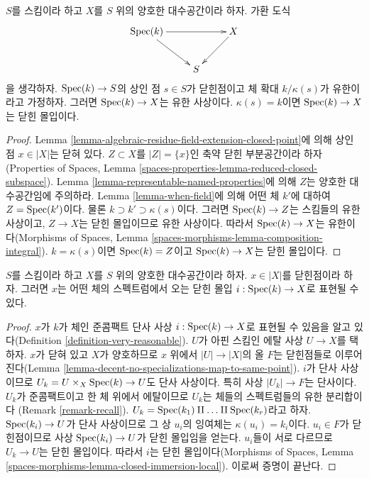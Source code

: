 \begin{lemma}
\label{lemma-finite-residue-field-extension-finite}
$S$를 스킴이라 하고 $X$를 $S$ 위의 양호한 대수공간이라 하자.
가환 도식
$$
\xymatrix{
\Spec(k) \ar[rr] \ar[rd] & & X \ar[ld] \\
& S
}
$$
을 생각하자. $\mathop{\mathrm{Spec}}(k) \to S$의 상인 점 $s \in S$가 닫힌점이고 체
확대 $k/\kappa(s)$가 유한이라고 가정하자. 그러면
$\mathop{\mathrm{Spec}}(k) \to X$는 유한 사상이다. $\kappa(s) = k$이면
$\mathop{\mathrm{Spec}}(k) \to X$는 닫힌 몰입이다.
\end{lemma}

\begin{proof}
Lemma \ref{lemma-algebraic-residue-field-extension-closed-point}에 의해
상인 점 $x \in |X|$는 닫혀 있다. $Z \subset X$를
$|Z| = \{x\}$인 축약 닫힌 부분공간이라 하자(Properties of Spaces,
Lemma \ref{spaces-properties-lemma-reduced-closed-subspace}). Lemma
\ref{lemma-representable-named-properties}에 의해 $Z$는 양호한
대수공간임에 주의하라. Lemma \ref{lemma-when-field}에 의해 어떤 체
$k'$에 대하여 $Z = \mathop{\mathrm{Spec}}(k')$이다. 물론
$k \supset k' \supset \kappa(s)$이다. 그러면 $\mathop{\mathrm{Spec}}(k) \to Z$는
스킴들의 유한 사상이고, $Z \to X$는 닫힌 몰입이므로 유한 사상이다.
따라서 $\mathop{\mathrm{Spec}}(k) \to X$는 유한이다(Morphisms of Spaces, Lemma
\ref{spaces-morphisms-lemma-composition-integral}). $k = \kappa(s)$이면
$\mathop{\mathrm{Spec}}(k) = Z$이고 $\mathop{\mathrm{Spec}}(k) \to X$는 닫힌 몰입이다.
\end{proof}

\begin{lemma}
\label{lemma-decent-space-closed-point}
$S$를 스킴이라 하고 $X$를 $S$ 위의 양호한 대수공간이라 하자.
$x \in |X|$를 닫힌점이라 하자. 그러면 $x$는 어떤 체의 스펙트럼에서
오는 닫힌 몰입 $i : \mathop{\mathrm{Spec}}(k) \to X$로 표현될 수 있다.
\end{lemma}

\begin{proof}
$x$가 $k$가 체인 준콤팩트 단사 사상 $i : \mathop{\mathrm{Spec}}(k) \to X$로 표현될
수 있음을 알고 있다(Definition \ref{definition-very-reasonable}).
$U$가 아핀 스킴인 에탈 사상 $U \to X$를 택하자. $x$가 닫혀 있고
$X$가 양호하므로 $x$ 위에서 $|U| \to |X|$의 올 $F$는 닫힌점들로
이루어진다(Lemma
\ref{lemma-decent-no-specializations-map-to-same-point}). $i$가 단사
사상이므로 $U_k = U \times_X \mathop{\mathrm{Spec}}(k) \to U$도 단사 사상이다.
특히 사상 $|U_k| \to F$는 단사이다. $U_k$가 준콤팩트이고 한 체
위에서 에탈이므로 $U_k$는 체들의 스펙트럼들의 유한 분리합이다
(Remark \ref{remark-recall}).
$U_k = \mathop{\mathrm{Spec}}(k_1) \amalg \ldots \amalg \mathop{\mathrm{Spec}}(k_r)$라고 하자.
$\mathop{\mathrm{Spec}}(k_i) \to U$가 단사 사상이므로 그 상 $u_i$의 잉여체는
$\kappa(u_i) = k_i$이다. $u_i \in F$가 닫힌점이므로 사상
$\mathop{\mathrm{Spec}}(k_i) \to U$가 닫힌 몰입임을 얻는다. $u_i$들이 서로 다르므로
$U_k \to U$는 닫힌 몰입이다. 따라서 $i$는 닫힌 몰입이다(Morphisms
of Spaces, Lemma
\ref{spaces-morphisms-lemma-closed-immersion-local}). 이로써 증명이
끝난다.
\end{proof}



